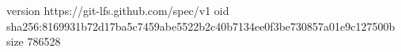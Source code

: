 version https://git-lfs.github.com/spec/v1
oid sha256:8169931b72d17ba5c7459abe5522b2c40b7134ee0f3be730857a01e9c127500b
size 786528
